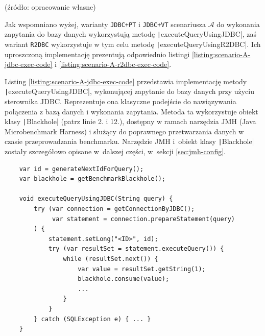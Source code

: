 \vspace{-20pt}
\begin{center}
    \small{(źródło: opracowanie własne)}
\end{center}

Jak wspomniano wyżej, warianty \texttt{JDBC+PT} i \texttt{JDBC+VT} scenariusza $\mathcal{A}$ do wykonania zapytania do bazy danych wykorzystują metodę \texttt|executeQueryUsingJDBC|, zaś wariant \texttt{R2DBC} wykorzystuje w tym celu metodę \texttt|executeQueryUsingR2DBC|. Ich uproszczoną implementację prezentują odpowiednio listingi \ref{listing:scenario-A-jdbc-exec-code} i \ref{listing:scenario-A-r2dbc-exec-code}.

Listing \ref{listing:scenario-A-jdbc-exec-code} przedstawia implementację metody \texttt|executeQueryUsingJDBC|, wykonującej zapytanie do bazy danych przy użyciu sterownika JDBC. Reprezentuje ona klasyczne podejście do nawiązywania połączenia z bazą danych i wykonania zapytania. Metoda ta wykorzystuje obiekt klasy \texttt|Blackhole| (patrz linie 2. i 12.), dostępny w ramach narzędzia JMH (Java Microbenchmark Harness) i służący do poprawnego przetwarzania danych w czasie przeprowadzania benchmarku. Narzędzie JMH i~obiekt klasy \texttt|Blackhole| zostały szczegółowo opisane w~dalszej części, w~sekcji \ref{sec:jmh-config}.

\begin{listing}[!ht]
    \begin{verbatim}
    var id = generateNextIdForQuery();
    var blackhole = getBenchmarkBlackhole();

    void executeQueryUsingJDBC(String query) {
        try (var connection = getConnectionByJDBC();
             var statement = connection.prepareStatement(query)
        ) {
            statement.setLong("<ID>", id);
            try (var resultSet = statement.executeQuery()) {
                while (resultSet.next()) {
                    var value = resultSet.getString(1);
                    blackhole.consume(value);
                    ...
                }
            }
        } catch (SQLException e) { ... }
    }
    \end{verbatim}
    \vspace{-10pt}
    \caption{Uproszczona implementacja metody wykonującej zapytanie do bazy danych przy użyciu sterownika JDBC w ramach scenariusza $\mathcal{A}$}
    \label{listing:scenario-A-jdbc-exec-code}
\end{listing}

